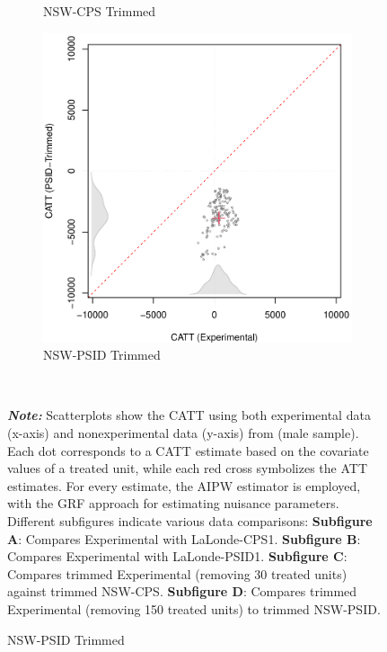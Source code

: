 \documentclass[letterpaper,12pt,leqno]{article}
\begin{document}
\begin{figure}[!ht]
\begin{minipage}[c]{1\textwidth}
\begin{subfigure}{0.4\linewidth}
            \caption{NSW-CPS Trimmed}
        \end{subfigure}
        \begin{subfigure}{0.4\linewidth}
            \includegraphics[width=\linewidth]{catt_nsw_psid_trim.pdf}
            \caption{NSW-PSID Trimmed}
        \end{subfigure}
    \end{minipage}%
    \\\raggedright
     {\footnotesize\textbf{\textit{Note:}} Scatterplots show the CATT using both experimental data (x-axis) and nonexperimental data (y-axis) from \citet{LaLonde} (male sample). Each dot corresponds to a CATT estimate based on the covariate values of a treated unit, while each red cross symbolizes the ATT estimates. For every estimate, the AIPW estimator is employed, with the GRF approach for estimating nuisance parameters. Different subfigures indicate various data comparisons: \textbf{Subfigure A}: Compares Experimental with LaLonde-CPS1. \textbf{Subfigure B}: Compares Experimental with LaLonde-PSID1. \textbf{Subfigure C}: Compares trimmed Experimental (removing 30 treated units) against trimmed NSW-CPS. \textbf{Subfigure D}: Compares trimmed Experimental (removing 150 treated units) to trimmed NSW-PSID.}
\end{figure}
\clearpage
\end{document}
